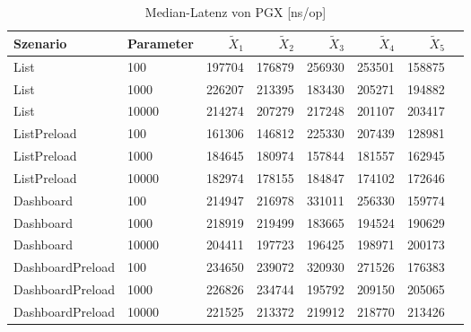 
\begin{table}[ht]
\setlength{\extrarowheight}{-1pt}
\centering
\caption{Median-Latenz von PGX [ns/op]}
\begin{tabular}{llrrrrrr}
\toprule
Szenario & Parameter & ${\tilde{X}_1}$ & ${\tilde{X}_2}$ & ${\tilde{X}_3}$ & ${\tilde{X}_4}$ & ${\tilde{X}_5}$ \\
\midrule
	List & 100 & 197704 & 176879 & 256930 & 253501 & 158875 \\
	List & 1000 & 226207 & 213395 & 183430 & 205271 & 194882 \\
	List & 10000 & 214274 & 207279 & 217248 & 201107 & 203417 \\
	ListPreload & 100 & 161306 & 146812 & 225330 & 207439 & 128981 \\
	ListPreload & 1000 & 184645 & 180974 & 157844 & 181557 & 162945 \\
	ListPreload & 10000 & 182974 & 178155 & 184847 & 174102 & 172646 \\
	Dashboard & 100 & 214947 & 216978 & 331011 & 256330 & 159774 \\
	Dashboard & 1000 & 218919 & 219499 & 183665 & 194524 & 190629 \\
	Dashboard & 10000 & 204411 & 197723 & 196425 & 198971 & 200173 \\
	DashboardPreload & 100 & 234650 & 239072 & 320930 & 271526 & 176383 \\
	DashboardPreload & 1000 & 226826 & 234744 & 195792 & 209150 & 205065 \\
	DashboardPreload & 10000 & 221525 & 213372 & 219912 & 218770 & 213426 \\
\bottomrule
\end{tabular}
\label{tab:durchsatz_pgx}
\end{table}
	
